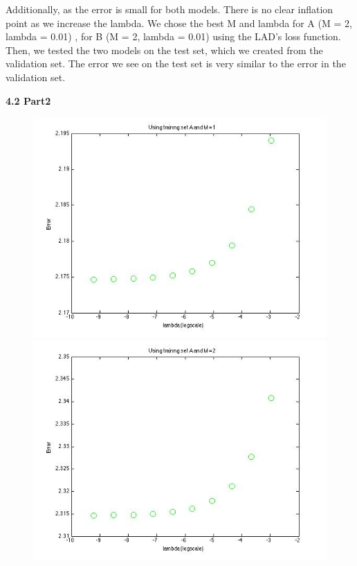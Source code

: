 Additionally, as the error is small for both models. There is no clear 
inflation point as we increase the lambda. We chose the best M and lambda
for A (M = 2, lambda = 0.01) , for B (M = 2, lambda = 0.01) using the LAD's loss function.  Then, we tested the two models on the test set, which we created from the validation set. 
The error we see on the test set is very similar to the error in the validation set. 


{\bfseries 4.2 Part2}
\begin{figure}[!htb]
  \includegraphics[width=\linewidth]{figures/p4_LASSO_regressA_m=1}
\endminipage\hfill
{}
  \includegraphics[width=\linewidth]{figures/p4_LASSO_regressA_m=2}

\end{figure}
